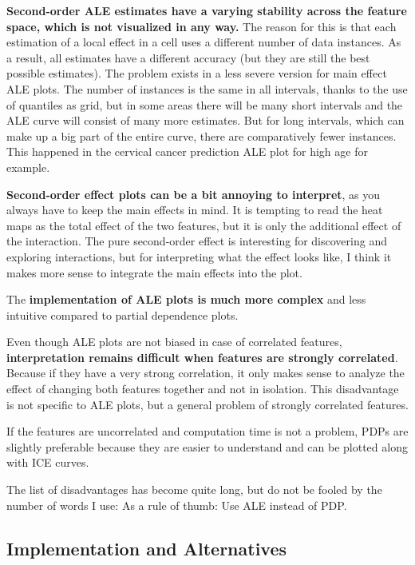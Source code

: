 \documentclass[
  12pt,
]{krantz}
\begin{document}
\textbf{Second-order ALE estimates have a varying stability across the feature space, which is not visualized in any way.}
The reason for this is that each estimation of a local effect in a cell uses a different number of data instances.
As a result, all estimates have a different accuracy (but they are still the best possible estimates).
The problem exists in a less severe version for main effect ALE plots.
The number of instances is the same in all intervals, thanks to the use of quantiles as grid, but in some areas there will be many short intervals and the ALE curve will consist of many more estimates.
But for long intervals, which can make up a big part of the entire curve, there are comparatively fewer instances.
This happened in the cervical cancer prediction ALE plot for high age for example.

\textbf{Second-order effect plots can be a bit annoying to interpret}, as you always have to keep the main effects in mind.
It is tempting to read the heat maps as the total effect of the two features, but it is only the additional effect of the interaction.
The pure second-order effect is interesting for discovering and exploring interactions, but for interpreting what the effect looks like, I think it makes more sense to integrate the main effects into the plot.

The \textbf{implementation of ALE plots is much more complex} and less intuitive compared to partial dependence plots.

Even though ALE plots are not biased in case of correlated features, \textbf{interpretation remains difficult when features are strongly correlated}.
Because if they have a very strong correlation, it only makes sense to analyze the effect of changing both features together and not in isolation.
This disadvantage is not specific to ALE plots, but a general problem of strongly correlated features.

If the features are uncorrelated and computation time is not a problem, PDPs are slightly preferable because they are easier to understand and can be plotted along with ICE curves.

The list of disadvantages has become quite long, but do not be fooled by the number of words I use:
As a rule of thumb: Use ALE instead of PDP.

\hypertarget{implementation-and-alternatives}{%
\subsection{Implementation and Alternatives}\label{implementation-and-alternatives}}
\end{document}
